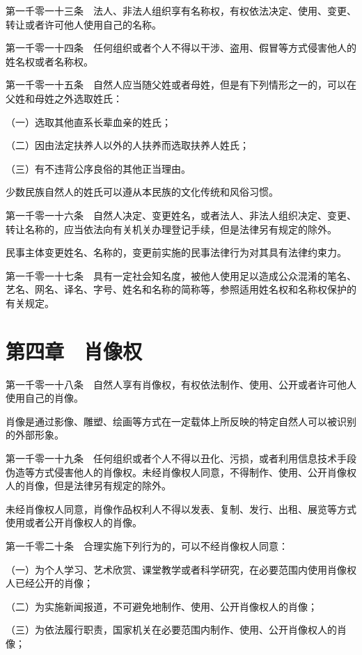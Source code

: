 \documentclass[UTF8,12pt,a4paper]{ctexbook}
\begin{document}
第一千零一十三条　法人、非法人组织享有名称权，有权依法决定、使用、变更、转让或者许可他人使用自己的名称。

第一千零一十四条　任何组织或者个人不得以干涉、盗用、假冒等方式侵害他人的姓名权或者名称权。

第一千零一十五条　自然人应当随父姓或者母姓，但是有下列情形之一的，可以在父姓和母姓之外选取姓氏：

（一）选取其他直系长辈血亲的姓氏；

（二）因由法定扶养人以外的人扶养而选取扶养人姓氏；

（三）有不违背公序良俗的其他正当理由。

少数民族自然人的姓氏可以遵从本民族的文化传统和风俗习惯。

第一千零一十六条　自然人决定、变更姓名，或者法人、非法人组织决定、变更、转让名称的，应当依法向有关机关办理登记手续，但是法律另有规定的除外。

民事主体变更姓名、名称的，变更前实施的民事法律行为对其具有法律约束力。

第一千零一十七条　具有一定社会知名度，被他人使用足以造成公众混淆的笔名、艺名、网名、译名、字号、姓名和名称的简称等，参照适用姓名权和名称权保护的有关规定。

\section*{第四章　肖像权}

第一千零一十八条　自然人享有肖像权，有权依法制作、使用、公开或者许可他人使用自己的肖像。

肖像是通过影像、雕塑、绘画等方式在一定载体上所反映的特定自然人可以被识别的外部形象。

第一千零一十九条　任何组织或者个人不得以丑化、污损，或者利用信息技术手段伪造等方式侵害他人的肖像权。未经肖像权人同意，不得制作、使用、公开肖像权人的肖像，但是法律另有规定的除外。

未经肖像权人同意，肖像作品权利人不得以发表、复制、发行、出租、展览等方式使用或者公开肖像权人的肖像。

第一千零二十条　合理实施下列行为的，可以不经肖像权人同意：

（一）为个人学习、艺术欣赏、课堂教学或者科学研究，在必要范围内使用肖像权人已经公开的肖像；

（二）为实施新闻报道，不可避免地制作、使用、公开肖像权人的肖像；

（三）为依法履行职责，国家机关在必要范围内制作、使用、公开肖像权人的肖像；
\end{document}
